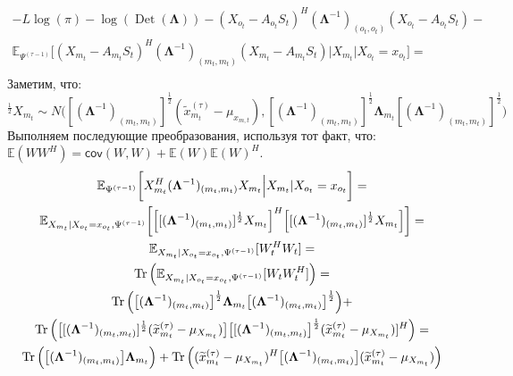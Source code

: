 \documentclass[11pt]{article}
\newcommand{\Expect}{\mathbb{E}}
\newcommand{\Cov}{\mathsf{cov}}
\DeclareMathOperator{\Det}{Det}
\begin{document}
\begin{equation*}
\begin{gathered}
-L \log(\pi) - \log (\Det(\mathbf{\Lambda}))  - (X_{o_t} - A_{o_t}S_t)^H (\mathbf{\Lambda}^{-1})_{(o_t, o_t)} (X_{o_t} - A_{o_t}S_t) - \\ \Expect_{\Psi^{(\tau-1)}} \bigg[ (X_{m_t} - A_{m_t}S_t)^H (\mathbf{\Lambda}^{-1})_{(m_t, m_t)} (X_{m_t} - A_{m_t}S_t) 
\Big|X_{m_t}|X_{o_t}=x_{o_t}\bigg] = \\
\end{gathered}
\end{equation*}
Заметим, что: 
\begin{equation*}
[(\mathbf{\Lambda}^{-1})_{(m_t, m_t)}]^{\frac{1}{2}}X_{m_t} \sim N\Big([(\mathbf{\Lambda}^{-1})_{(m_t, m_t)}]^{\frac{1}{2}}(\widetilde{x}_{m_t}^{(\tau)} - \mu_{x_{m,t}}),[(\mathbf{\Lambda}^{-1})_{(m_t, m_t)}]^{\frac{1}{2}}\mathbf{\Lambda}_{m_t}[(\mathbf{\Lambda}^{-1})_{(m_t, m_t)}]^{\frac{1}{2}}\Big)
\end{equation*}
Выполняем последующие преобразования, используя тот факт, что: $\Expect(WW^H)=\Cov(W,W)+\Expect(W)\Expect(W)^H$.
\begin{equation*}
\begin{gathered}
\Expect_{\Psi^{(\tau-1)}}\bigg[X_{m_t}^H (\mathbf{\Lambda}^{-1})_{(m_t, m_t)}X_{m_t}   \Big|X_{m_t}|X_{o_t}=x_{o_t}\bigg] = \\
\Expect_{X_{m_t}|X_{o_t}=x_{o_t}, \Psi^{(\tau-1)}}\bigg[\Big[[(\mathbf{\Lambda}^{-1})_{(m_t, m_t)}]^{\frac{1}{2}}X_{m_t}\Big]^H\Big[[(\mathbf{\Lambda}^{-1})_{(m_t, m_t)}]^{\frac{1}{2}}X_{m_t}\Big]\bigg] = \\
\Expect_{X_{m_t}|X_{o_t}=x_{o_t}, \Psi^{(\tau-1)}}[W_t^HW_t] = \\
\Tr \Big( \Expect_{X_{m_t}|X_{o_t}=x_{o_t}, \Psi^{(\tau-1)}}[W_tW_t^H] \Big) = \\
\Tr \Big( \big[(\mathbf{\Lambda}^{-1})_{(m_t, m_t)}\big]^{\frac{1}{2}}\mathbf{\Lambda}_{m_t}\big[(\mathbf{\Lambda}^{-1})_{(m_t, m_t)}\big]^{\frac{1}{2}} \Big) + \\ \Tr \Big( \big[[(\mathbf{\Lambda}^{-1})_{(m_t, m_t)}]^{\frac{1}{2}}(\widetilde{x}_{m_t}^{(\tau)} - \mu_{X_{m_t}})\big]\big[[(\mathbf{\Lambda}^{-1})_{(m_t, m_t)}\big]^{\frac{1}{2}}(\widetilde{x}_{m_t}^{(\tau)} - \mu_{X_{m_t}})]^H \Big)= \\
\Tr \Big( \big[(\mathbf{\Lambda}^{-1})_{(m_t, m_t)}\big]\mathbf{\Lambda}_{m_t} \Big) + \Tr \Big((\widetilde{x}_{m_t}^{(\tau)} - \mu_{X_{m_t}})^H\big[(\mathbf{\Lambda}^{-1})_{(m_t, m_t)}\big](\widetilde{x}_{m_t}^{(\tau)} - \mu_{X_{m_t}}) \Big) \\
\end{gathered}
\end{equation*}
\end{document}
